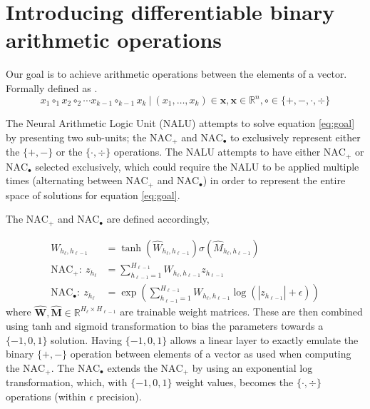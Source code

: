 \section{Introducing differentiable binary arithmetic operations}
Our goal is to achieve arithmetic operations between the elements of a vector. Formally defined as .
\begin{equation}
x_1\circ_1 x_2 \circ_2 \cdots x_{k-1} \circ_{k-1} x_{k}\ |\ (x_1, \dots, x_k) \in \mathbf{x}, \mathbf{x} \in \mathbb{R}^n, \circ \in \{+, -, \cdot, \div \}
\label{eq:goal}
\end{equation}

The Neural Arithmetic Logic Unit (NALU)\cite{trask-nalu} attempts to solve equation \ref{eq:goal} by presenting two sub-units; the $\text{NAC}_{+}$ and $\text{NAC}_{\bullet}$ to exclusively represent either the $\{+, -\}$ or the $\{\cdot, \div \}$ operations.
The NALU attempts to have either $\text{NAC}_{+}$ or $\text{NAC}_{\bullet}$ selected exclusively, which could require the NALU to be applied multiple times (alternating between $\text{NAC}_{+}$ and $\text{NAC}_{\bullet}$) in order to represent the entire space of solutions for equation \ref{eq:goal}.

The $\text{NAC}_{+}$ and $\text{NAC}_{\bullet}$ are defined accordingly,

\begin{align}
W_{h_\ell, h_{\ell-1}} &= \tanh(\hat{W}_{h_\ell, h_{\ell-1}}) \sigma(\hat{M}_{h_\ell, h_{\ell-1}}) \label{eq:weight}\\
\textrm{NAC}_+:\ z_{h_\ell} &= \sum_{h_{\ell-1}=1}^{H_{\ell-1}} W_{h_{\ell}, h_{\ell-1}} z_{h_{\ell-1}} \label{eq:naca}\\
\textrm{NAC}_\bullet:\ z_{h_\ell} &= \exp\left(\sum_{h_{\ell-1}=1}^{H_{\ell-1}} W_{h_{\ell}, h_{\ell-1}} \label{eq:nacm}\log(|z_{h_{\ell-1}}| + \epsilon) \right)
\end{align}
where $\hat{\mathbf{W}}, \hat{\mathbf{M}} \in \mathbb{R}^{H_{\ell} \times H_{\ell-1}}$ are trainable weight matrices. These are then combined using tanh and sigmoid transformation to bias the parameters towards a $\{-1,0,1\}$ solution. Having $\{-1,0,1\}$ allows a linear layer to exactly emulate the binary $\{+, -\}$ operation between elements of a vector as used when computing the $\text{NAC}_{+}$.
The $\text{NAC}_{\bullet}$ extends the $\text{NAC}_{+}$ by using an exponential log transformation, which, with $\{-1,0,1\}$ weight values, becomes the $\{\cdot, \div \}$ operations (within $\epsilon$ precision).


